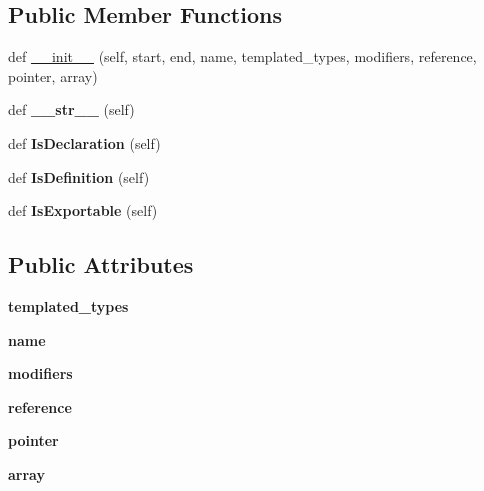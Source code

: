 \subsection*{Public Member Functions}
\begin{DoxyCompactItemize}
\item 
def \hyperlink{classcpp_1_1ast_1_1_type_adc20d88db721b5d7b513c08a4d6753c9}{\+\_\+\+\_\+init\+\_\+\+\_\+} (self, start, end, name, templated\+\_\+types, modifiers, reference, pointer, array)
\item 
\mbox{\label{classcpp_1_1ast_1_1_type_a1a10eff21f6150b7e14bde3788fa069b}} 
def {\bfseries \+\_\+\+\_\+str\+\_\+\+\_\+} (self)
\item 
\mbox{\label{classcpp_1_1ast_1_1_type_a590071a2bce7ea5140d7eb86c90f63bf}} 
def {\bfseries Is\+Declaration} (self)
\item 
\mbox{\label{classcpp_1_1ast_1_1_type_aedff25dc3736e83388742e55fe29159b}} 
def {\bfseries Is\+Definition} (self)
\item 
\mbox{\label{classcpp_1_1ast_1_1_type_a80dce781581c03e550ce51a9a33ca158}} 
def {\bfseries Is\+Exportable} (self)
\end{DoxyCompactItemize}
\subsection*{Public Attributes}
\begin{DoxyCompactItemize}
\item 
\mbox{\label{classcpp_1_1ast_1_1_type_a7c38fcafa00dae6ee22bab783086a1a7}} 
{\bfseries templated\+\_\+types}
\item 
\mbox{\label{classcpp_1_1ast_1_1_type_a5905424e2b65f0215b6ecd73b4bfe24c}} 
{\bfseries name}
\item 
\mbox{\label{classcpp_1_1ast_1_1_type_a0effa0a077eda79943e881955b4c51a5}} 
{\bfseries modifiers}
\item 
\mbox{\label{classcpp_1_1ast_1_1_type_a8d2cddd631397c3bf86198cc420d584d}} 
{\bfseries reference}
\item 
\mbox{\label{classcpp_1_1ast_1_1_type_a37234bb68915c93894cbc8e366c1eaad}} 
{\bfseries pointer}
\item 
\mbox{\label{classcpp_1_1ast_1_1_type_a1fd0493e82da315bcb4c02b0cf2133a3}} 
{\bfseries array}
\end{DoxyCompactItemize}



